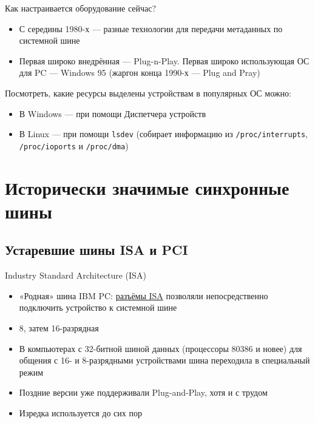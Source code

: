 \documentclass[xetex,aspectratio=43]{beamer}
\begin{document}
\begin{frame}[fragile]{Как настраивается оборудование сейчас?}
	\begin{itemize}
		\item
		С середины 1980-х --- разные технологии для передачи метаданных по
		системной шине
		\item
		Первая широко внедрённая --- Plug-n-Play. Первая широко использующая            ОС для PC --- Windows 95 (жаргон конца 1990-х --- Plug and Pray)
	\end{itemize}

	\pause

	Посмотреть, какие ресурсы выделены устройствам в популярных ОС можно:

	\begin{itemize}
		\item
		В Windows --- при помощи Диспетчера устройств
		\item
		В Linux --- при помощи \texttt{lsdev} (собирает информацию из
		\texttt{/proc/interrupts}, \texttt{/proc/ioports} и
		\texttt{/proc/dma})
	\end{itemize}
\end{frame}

\section{Исторически значимые синхронные шины}

\subsection{Устаревшие шины ISA и PCI}

\begin{frame}{Industry Standard Architecture (ISA)}
    \begin{itemize}
        \item «Родная» шина IBM PC: \href{https://en.wikipedia.org/wiki/Industry_Standard_Architecture}{разъёмы ISA} позволяли непосредственно подключить устройство к системной шине
        \item 8, затем 16-разрядная
        \item В компьютерах с 32-битной шиной данных (процессоры 80386 и новее) для общения с 16- и 8-разрядными устройствами шина переходила в специальный режим
        \item Поздние версии уже поддерживали Plug-and-Play, хотя и с трудом
        \pause
        \item Изредка используется до сих пор
    \end{itemize}
\end{frame}
\end{document}
